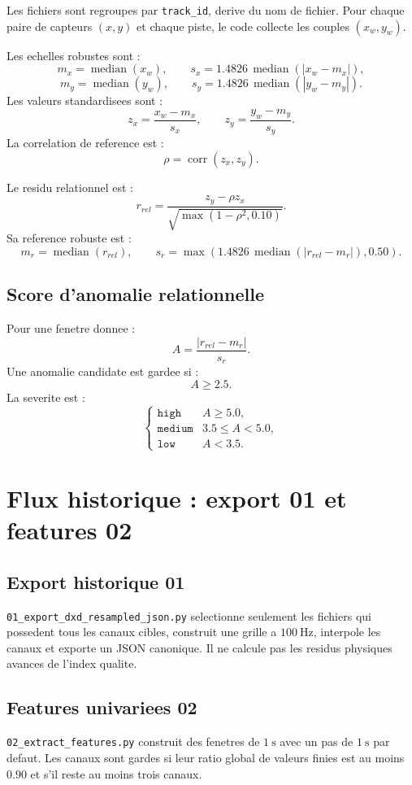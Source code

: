 \documentclass[11pt,a4paper]{article}
\newcommand{\median}{\operatorname{median}}
\begin{document}
Les fichiers sont regroupes par \texttt{track\_id}, derive du nom de fichier.
Pour chaque paire de capteurs $(x,y)$ et chaque piste, le code collecte les couples $(x_w,y_w)$.

Les echelles robustes sont :
\[
  m_x=\median(x_w),\qquad
  s_x=1.4826\,\median(|x_w-m_x|),
\]
\[
  m_y=\median(y_w),\qquad
  s_y=1.4826\,\median(|y_w-m_y|).
\]
Les valeurs standardisees sont :
\[
  z_x=\frac{x_w-m_x}{s_x},\qquad
  z_y=\frac{y_w-m_y}{s_y}.
\]
La correlation de reference est :
\[
  \rho=\operatorname{corr}(z_x,z_y).
\]

Le residu relationnel est :
\[
  r_{rel}=\frac{z_y-\rho z_x}{\sqrt{\max(1-\rho^2,0.10)}}.
\]
Sa reference robuste est :
\[
  m_r=\median(r_{rel}),\qquad
  s_r=\max(1.4826\,\median(|r_{rel}-m_r|),0.50).
\]

\subsection{Score d'anomalie relationnelle}

Pour une fenetre donnee :
\[
  A=\frac{|r_{rel}-m_r|}{s_r}.
\]
Une anomalie candidate est gardee si :
\[
  A\ge 2.5.
\]
La severite est :
\[
\begin{cases}
\texttt{high} & A\ge 5.0,\\
\texttt{medium} & 3.5\le A<5.0,\\
\texttt{low} & A<3.5.
\end{cases}
\]

\section{Flux historique : export 01 et features 02}

\subsection{Export historique 01}

\texttt{01\_export\_dxd\_resampled\_json.py} selectionne seulement les fichiers qui possedent tous les canaux cibles, construit une grille a $100~\mathrm{Hz}$, interpole les canaux et exporte un JSON canonique. Il ne calcule pas les residus physiques avances de l'index qualite.

\subsection{Features univariees 02}

\texttt{02\_extract\_features.py} construit des fenetres de $1~\mathrm{s}$ avec un pas de $1~\mathrm{s}$ par defaut.
Les canaux sont gardes si leur ratio global de valeurs finies est au moins $0.90$ et s'il reste au moins trois canaux.
\end{document}

